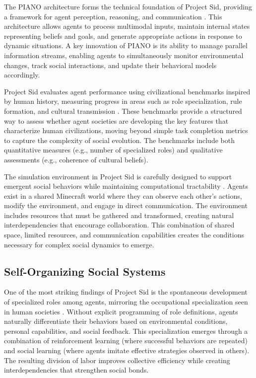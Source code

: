 \documentclass[a4paper, 12pt]{article}
\begin{document}
The PIANO architecture forms the technical foundation of Project Sid, providing a framework for agent perception, reasoning, and communication \autocite{al2024projectsidmanyagentsimulations}. This architecture allows agents to process multimodal inputs, maintain internal states representing beliefs and goals, and generate appropriate actions in response to dynamic situations. A key innovation of PIANO is its ability to manage parallel information streams, enabling agents to simultaneously monitor environmental changes, track social interactions, and update their behavioral models accordingly.

Project Sid evaluates agent performance using civilizational benchmarks inspired by human history, measuring progress in areas such as role specialization, rule formation, and cultural transmission \autocite{al2024projectsidmanyagentsimulations}. These benchmarks provide a structured way to assess whether agent societies are developing the key features that characterize human civilizations, moving beyond simple task completion metrics to capture the complexity of social evolution. The benchmarks include both quantitative measures (e.g., number of specialized roles) and qualitative assessments (e.g., coherence of cultural beliefs).

The simulation environment in Project Sid is carefully designed to support emergent social behaviors while maintaining computational tractability \autocite{al2024projectsidmanyagentsimulations}. Agents exist in a shared Minecraft world where they can observe each other's actions, modify the environment, and engage in direct communication. The environment includes resources that must be gathered and transformed, creating natural interdependencies that encourage collaboration. This combination of shared space, limited resources, and communication capabilities creates the conditions necessary for complex social dynamics to emerge.

\subsection{Self-Organizing Social Systems}

One of the most striking findings of Project Sid is the spontaneous development of specialized roles among agents, mirroring the occupational specialization seen in human societies \autocite{al2024projectsidmanyagentsimulations}. Without explicit programming of role definitions, agents naturally differentiate their behaviors based on environmental conditions, personal capabilities, and social feedback. This specialization emerges through a combination of reinforcement learning (where successful behaviors are repeated) and social learning (where agents imitate effective strategies observed in others). The resulting division of labor improves collective efficiency while creating interdependencies that strengthen social bonds.
\end{document}
